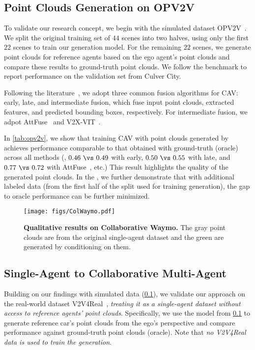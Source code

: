 \subsection{Point Clouds Generation on OPV2V}
\label{exp:opv2v}
To validate our research concept, we begin with the simulated dataset OPV2V~\citep{xu2022opv2v}. We split the original training set of $44$ scenes into two halves, using only the first $22$ scenes to train our generation model. For the remaining $22$ scenes, we generate point clouds for reference agents based on the ego agent’s point clouds and compare these results to ground-truth point clouds. We follow the benchmark to report performance on the validation set from Culver City.



Following the literature~\citep{xu2022opv2v,xu2023v2v4real}, we adopt three common fusion algorithms for CAV: early, late, and intermediate fusion, which fuse input point clouds, extracted features, and predicted bounding boxes, respectively. For intermediate fusion, we adpot AttFuse~\citep{xu2022opv2v} and V2X-VIT~\citep{xu2022v2xvit}. 






In \cref{tab:opv2v}, we show that training CAV with point clouds generated by \ours achieves performance comparable to that obtained with ground-truth (oracle) across all methods (\eg, $0.46~\vs~0.49$ with early, $0.50~\vs~0.55$ with late, and $0.77~\vs~0.72$ with AttFuse~\citep{xu2022opv2v}, etc.) This result highlights the quality of the generated point clouds. In the \supp, we further demonstrate that with additional labeled data (from the first half of the split used for training generation), the gap to oracle performance can be further minimized. 




\begin{figure*}[t]
\centering
\texttt{[image: figs/ColWaymo.pdf]}
\vspace{-3mm}
\caption{
\label{fig:colwaymo}
\small \textbf{Qualitative results on Collaborative Waymo.} The gray point clouds are from the original single-agent dataset and the green are generated by \ours conditioning on them.
}
\vspace{-3mm}
\end{figure*}

\subsection{Single-Agent to Collaborative Multi-Agent}
\label{exp:real}
 Building on our findings with simulated data (\cf \cref{exp:opv2v}), we validate our approach on the real-world dataset V2V4Real~\citep{xu2023v2v4real}, \emph{treating it as a single-agent dataset without access to reference agents’ point clouds}. Specifically, we use the model from \cref{exp:opv2v} to generate reference car's point clouds from the ego’s perspective and compare performance against ground-truth point clouds (oracle). Note that \emph{no V2V4Real data is used to train the generation}.


